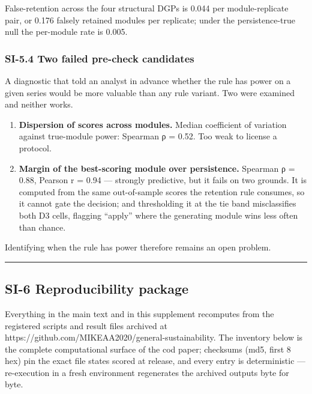 \documentclass[11pt]{article}
\providecommand{\tightlist}{\setlength{\itemsep}{0.2em}\setlength{\parskip}{0pt}}
\begin{document}
False-retention across the four structural DGPs is 0.044 per
module-replicate pair, or 0.176 falsely retained modules per replicate;
under the persistence-true null the per-module rate is 0.005.

\subsubsection{SI-5.4 Two failed pre-check
candidates}\label{si-5.4-two-failed-pre-check-candidates}

A diagnostic that told an analyst in advance whether the rule has power
on a given series would be more valuable than any rule variant. Two were
examined and neither works.

\begin{enumerate}
\def\labelenumi{\arabic{enumi}.}
\tightlist
\item
  \textbf{Dispersion of scores across modules.} Median coefficient of
  variation against true-module power: Spearman ρ = 0.52. Too weak to
  license a protocol.
\item
  \textbf{Margin of the best-scoring module over persistence.} Spearman
  ρ = 0.88, Pearson r = 0.94 --- strongly predictive, but it fails on
  two grounds. It is computed from the same out-of-sample scores the
  retention rule consumes, so it cannot gate the decision; and
  thresholding it at the tie band misclassifies both D3 cells, flagging
  ``apply'' where the generating module wins less often than chance.
\end{enumerate}

Identifying when the rule has power therefore remains an open problem.

\begin{center}\rule{0.5\linewidth}{0.5pt}\end{center}

\subsection{SI-6 Reproducibility
package}\label{si-6-reproducibility-package}

Everything in the main text and in this supplement recomputes from the
registered scripts and result files archived at
https://github.com/MIKEAA2020/general-sustainability. The inventory
below is the complete computational surface of the cod paper; checksums
(md5, first 8 hex) pin the exact file states scored at release, and
every entry is deterministic --- re-execution in a fresh environment
regenerates the archived outputs byte for byte.
\end{document}
